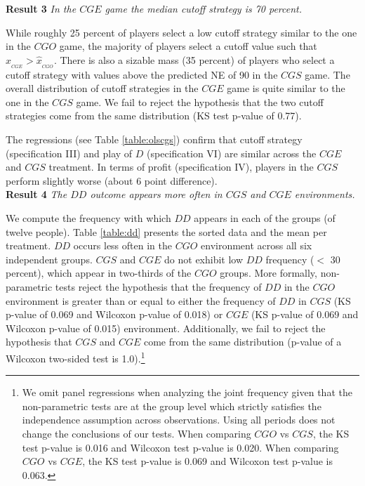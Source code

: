 \documentclass[11pt,english]{article}
\begin{document}
\noindent \textbf{Result 3}
\textit{In the $CGE$ game the median cutoff strategy is 70 percent.}

While roughly 25 percent of players select a low cutoff strategy similar to the one in the $CGO$ game, the majority of players select a cutoff value such that $\hat{x}_{_{CGE}}> \hat{x}_{_{CGO}}$. There is also a sizable mass (35 percent) of players who select a cutoff strategy with values above the predicted NE of 90 in the $CGS$ game. The overall distribution of cutoff strategies in the $CGE$ game is quite similar to the one in the $CGS$ game. We fail to reject the hypothesis that the two cutoff strategies come from the same distribution (KS test p-value of 0.77).

The regressions (see Table \ref{table:olscgs}) confirm that cutoff strategy (specification III) and play of $D$ (specification VI) are similar across the $CGE$ and $CGS$ treatment. In terms of profit (specification IV), players in the $CGS$ perform slightly worse (about 6 point difference).\\

\noindent \textbf{Result 4}
\textit{The $DD$ outcome appears more often in $CGS$ and $CGE$ environments.}

We compute the frequency with which $DD$ appears in each of the groups (of twelve people). Table \ref{table:dd} presents the sorted data and the mean per treatment. $DD$ occurs less often in the $CGO$ environment across all six independent groups. $CGS$ and $CGE$ do not exhibit low $DD$ frequency ($<$ 30 percent), which appear in two-thirds of the $CGO$ groups. More formally, non-parametric tests reject the hypothesis that the frequency of $DD$ in the $CGO$ environment is greater than or equal to either the frequency of $DD$ in $CGS$ (KS p-value of 0.069 and Wilcoxon p-value of 0.018) or $CGE$ (KS p-value of 0.069 and Wilcoxon p-value of 0.015) environment. Additionally, we fail to reject the hypothesis that $CGS$ and $CGE$ come from the same distribution (p-value of a Wilcoxon two-sided test is 1.0).\footnote{We omit panel regressions when analyzing the joint frequency given that the non-parametric tests are at the group level which strictly satisfies the independence assumption across observations. Using all periods does not change the conclusions of our tests. When comparing $CGO$ vs $CGS$, the KS test p-value is 0.016 and Wilcoxon test p-value is 0.020. When comparing $CGO$ vs $CGE$, the KS test p-value is 0.069 and Wilcoxon test p-value is 0.063. }\\
\end{document}
